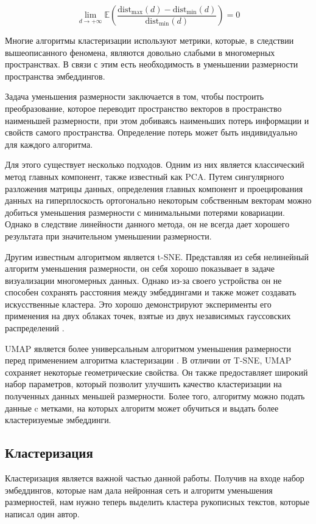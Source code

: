 $$
\lim_{d\rightarrow+\infty} \mathbb{E}\left( 
    \frac{\text{dist}_{\text{max}}(d) - \text{dist}_{\text{min}}(d)}{\text{dist}_{\text{min}}(d)}
\right) = 0
$$

\bigskip
Многие алгоритмы кластеризации используют метрики, которые, в следствии вышеописанного феномена, являются довольно слабыми в многомерных пространствах. В связи с этим есть необходимость в уменьшении размерности пространства эмбеддингов.

Задача уменьшения размерности заключается в том, чтобы построить преобразование, которое переводит пространство векторов в пространство наименьшей размерности, при этом добиваясь наименьших потерь информации и свойств самого пространства. Определение потерь может быть индивидуально для каждого алгоритма. 

Для этого существует несколько подходов. Одним из них является классический метод главных компонент, также известный как PCA. Путем сингулярного разложения матрицы данных, определения главных компонент и проецирования данных на гиперплоскость ортогонально некоторым собственным векторам можно добиться уменьшения размерности с минимальными потерями ковариации. Однако в следствие линейности данного метода, он не всегда дает хорошего результата при значительном уменьшении размерности.

Другим известным алгоритмом является t-SNE. Представляя из себя нелинейный алгоритм уменьшения размерности, он себя хорошо показывает в задаче визуализации многомерных данных. Однако из-за своего устройства он не способен сохранять расстояния между эмбеддингами и также может создавать искусственные кластера. Это хорошо демонстрируют эксперименты его применения на двух облаках точек, взятые из двух независимых гауссовских распределений \cite{pca_bad}.

UMAP является более универсальным алгоритмом уменьшения размерности перед применением алгоритма кластеризации \cite{umap}. В отличии от T-SNE, UMAP сохраняет некоторые геометрические свойства. Он также предоставляет широкий набор параметров, который позволит улучшить качество кластеризации на полученных данных меньшей размерности. Более того, алгоритму можно подать данные c метками, на которых алгоритм может обучиться и выдать более кластеризуемые эмбеддинги.

\subsection{Кластеризация}

Кластеризация является важной частью данной работы. Получив на входе набор эмбеддингов, которые нам дала нейронная сеть и алгоритм уменьшения размерностей, нам нужно теперь выделить кластера рукописных текстов, которые написал один автор. 

